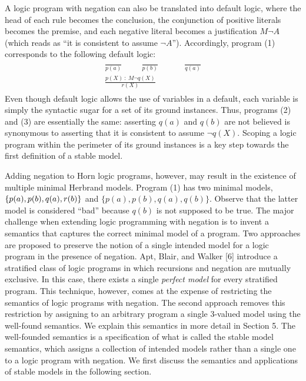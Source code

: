 A logic program with negation can also be translated into default logic, where the head 
of each rule becomes the conclusion, the conjunction of positive literals becomes the premise, 
and each negative literal becomes a justification $M \neg A$ (which reads as ``it is consistent to assume $\neg A$''). 
Accordingly, program (1) corresponds to the following default logic:
\begin{align}
    \begin{split}
        \frac{}{p(a)} \hspace{1cm} \frac{}{p(b)} \hspace{1cm} &\frac{}{q(a)} \\ 
        \frac{p(X) \: : \: M \neg q(X)}{r(X)}&
    \end{split}
\end{align}
Even though default logic allows the use of variables in a default, each variable is simply 
the syntactic sugar for a set of its ground instances. Thus, programs (2) and (3) are essentially 
the same: asserting $q(a)$ and $q(b)$ are not believed is synonymous to asserting that it is consistent to assume 
$\neg q(X)$. Scoping a logic program within the perimeter of its ground instances is a key step 
towards the first definition of a stable model. 

Adding negation to Horn logic programs, however, may result in the existence of multiple minimal 
Herbrand models. 
Program (1) has two minimal models, $\{p(a),p(b),\\q(a),r(b)\}$ and $\{p(a),p(b),q(a),q(b)\}$. 
Observe that the latter model is considered ``bad'' because $q(b)$ is not supposed to be true. 
The major challenge when extending logic programming with negation is to invent a semantics that 
captures the correct minimal model of a program. 
Two approaches are proposed to preserve the notion of a single intended model for a logic program 
in the presence of negation. 
Apt, Blair, and Walker [6] introduce a stratified class of logic programs in which recursions and negation are 
mutually exclusive. In this case, there exists a single \emph{perfect model} for every stratified program. 
This technique, however, comes at the expense of restricting the semantics of logic programs with negation. 
The second approach removes this restriction by assigning to an arbitrary program a single 3-valued 
model using the well-found semantics. We explain this semantics in more detail in Section 5. The 
well-founded semantics is a specification of what is called the stable model semantics, which 
assigns a collection of intended models rather than a single one to a logic program with negation. 
We first discuss the semantics and applications of stable models in the following section. 